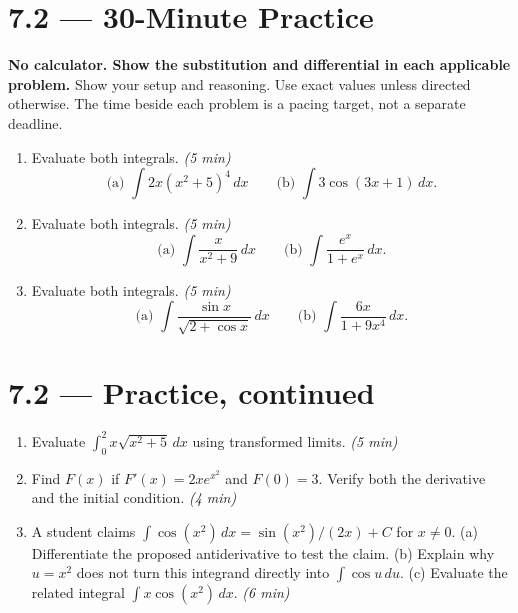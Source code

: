 \documentclass[11pt]{article}
\newcommand{\practice}[2]{\clearpage\section*{#1 --- 30-Minute Practice}\textbf{#2} Show your setup and reasoning. Use exact values unless directed otherwise. The time beside each problem is a pacing target, not a separate deadline.}
\newcommand{\continued}[1]{\clearpage\section*{#1 --- Practice, continued}}
\newcommand{\mins}[1]{\hfill\textit{(#1 min)}}
\newcommand{\dx}{\,dx}
\begin{document}
\practice{7.2}{No calculator. Show the substitution and differential in each applicable problem.}
\begin{enumerate}
\item Evaluate both integrals. \mins{5}
\[
\text{(a) }\int 2x(x^2+5)^4\dx\qquad
\text{(b) }\int3\cos(3x+1)\dx.
\]
\vfill
\item Evaluate both integrals. \mins{5}
\[
\text{(a) }\int\frac{x}{x^2+9}\dx\qquad
\text{(b) }\int\frac{e^x}{1+e^x}\dx.
\]
\vfill
\item Evaluate both integrals. \mins{5}
\[
\text{(a) }\int\frac{\sin x}{\sqrt{2+\cos x}}\dx\qquad
\text{(b) }\int\frac{6x}{1+9x^4}\dx.
\]
\vfill
\end{enumerate}
\continued{7.2}
\begin{enumerate}[start=4]
\item Evaluate $\int_0^2x\sqrt{x^2+5}\dx$ using transformed limits. \mins{5}
\vfill
\item Find $F(x)$ if $F'(x)=2x e^{x^2}$ and $F(0)=3$. Verify both the derivative and the initial condition. \mins{4}
\vfill
\item A student claims $\int\cos(x^2)\dx=\sin(x^2)/(2x)+C$ for $x\ne0$.
(a) Differentiate the proposed antiderivative to test the claim.
(b) Explain why $u=x^2$ does not turn this integrand directly into $\int\cos u\,du$.
(c) Evaluate the related integral $\int x\cos(x^2)\dx$. \mins{6}
\vfill
\end{enumerate}
\end{document}
